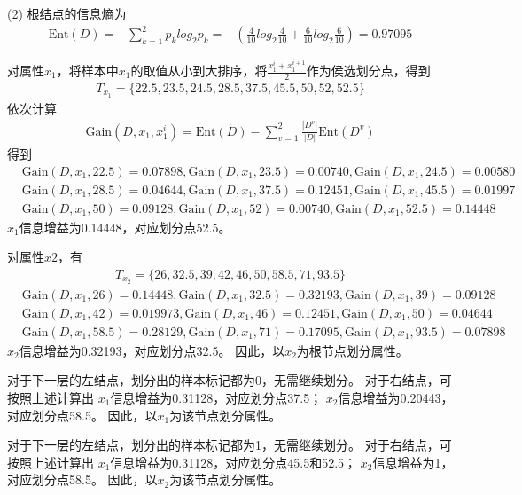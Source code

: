 \documentclass{article}
\begin{document}
	\noindent (2) 根结点的信息熵为
	\begin{align*}
		\text{Ent}(D)=-\sum\limits_{k=1}^2 p_k log_2 p_k
		=-(\frac{4}{10}log_2\frac{4}{10}+\frac{6}{10}log_2\frac{6}{10})
		=0.97095
	\end{align*}

	对属性$x_1$，将样本中$x_1$的取值从小到大排序，将$\frac{x_1^i+x_1^{i+1}}{2}$作为侯选划分点，得到
	\begin{align*}
		T_{x_1}=\{22.5,23.5,24.5,28.5,37.5,45.5,50,52,52.5\}
	\end{align*}
	依次计算
	\begin{align*}
		\text{Gain}(D,x_1,x_1^i)
		=\text{Ent}(D)-\sum\limits_{v=1}^2\frac{|D^v|}{|D|}\text{Ent}(D^v)
	\end{align*}
	得到
	\begin{align*}
		& \text{Gain}(D,x_1,22.5)=0.07898,\text{Gain}(D,x_1,23.5)=0.00740,\text{Gain}(D,x_1,24.5)=0.00580 \\
		& \text{Gain}(D,x_1,28.5)=0.04644,\text{Gain}(D,x_1,37.5)=0.12451,\text{Gain}(D,x_1,45.5)=0.01997 \\
		& \text{Gain}(D,x_1,50)=0.09128,\text{Gain}(D,x_1,52)=0.00740,\text{Gain}(D,x_1,52.5)=0.14448
	\end{align*}
	$x_1$信息增益为0.14448，对应划分点52.5。

	对属性$x2$，有
	\begin{align*}
		T_{x_2}=\{26,32.5,39,42,46,50,58.5,71,93.5\}
	\end{align*}
	\begin{align*}
		& \text{Gain}(D,x_1,26)=0.14448,\text{Gain}(D,x_1,32.5)=0.32193,\text{Gain}(D,x_1,39)=0.09128 \\
		& \text{Gain}(D,x_1,42)=0.019973,\text{Gain}(D,x_1,46)=0.12451,\text{Gain}(D,x_1,50)=0.04644 \\
		& \text{Gain}(D,x_1,58.5)=0.28129,\text{Gain}(D,x_1,71)=0.17095,\text{Gain}(D,x_1,93.5)=0.07898
	\end{align*}
	$x_2$信息增益为0.32193，对应划分点32.5。
	因此，以$x_2$为根节点划分属性。

	对于下一层的左结点，划分出的样本标记都为0，无需继续划分。
	对于右结点，可按照上述计算出
	$x_1$信息增益为0.31128，对应划分点37.5；
	$x_2$信息增益为0.20443，对应划分点58.5。
	因此，以$x_1$为该节点划分属性。

	对于下一层的左结点，划分出的样本标记都为1，无需继续划分。
	对于右结点，可按照上述计算出
	$x_1$信息增益为0.31128，对应划分点45.5和52.5；
	$x_2$信息增益为1，对应划分点58.5。
	因此，以$x_2$为该节点划分属性。
\end{document}
